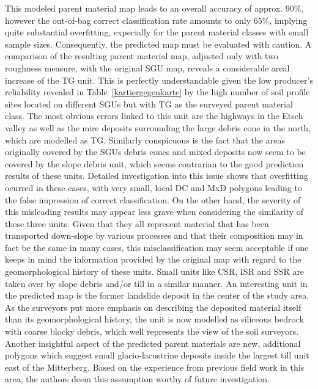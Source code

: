 \documentclass[preprint,12pt,authoryear]{elsarticle}
\begin{document}
This modeled parent material map leads to an overall accuracy of approx. 90\%, however the out-of-bag correct classification rate amounts to only 65\%, implying quite substantial overfitting, expecially for the parent material classes with small sample sizes. Consequently, the predicted map must be evaluated with caution. A comparison of the resulting parent material map, adjusted only with two roughness measure, with the original SGU map, reveals a considerable areal increase of the TG unit. This is perfectly understandable given the low producer's reliability revealed in Table~\ref{kartiergegenkarte} by the high number of soil profile sites located on different SGUs but with TG as the surveyed parent material class.  The most obvious errors linked to this unit are the highways in the Etsch valley as well as the mire deposits surrounding the large debris cone in the north, which are modelled as TG. Similarly conspicuous is the fact that the areas originally covered by the SGUs debris cones and mixed deposits now seem to be covered by the slope debris unit, which seems contrarian to the good prediction results of these units. Detailed investigation into this issue shows that overfitting ocurred in these cases, with very small, local DC and MxD polygons leading to the false impression of correct classification. On the other hand, the severity of this misleading results may appear less grave when  considering the similarity of these three units. Given that they all represent material that has been transported down-slope by various processes and that their composition may in fact be the same in many cases, this misclassification may seem acceptable if one keeps in mind the information provided by the original map with regard to the geomorphological history of these units. Small units like CSR, ISR and SSR are taken over by slope debris and/or till in a similar manner. An interesting unit in the predicted map is the former landslide deposit in the center of the study area. As the surveyors put more emphasis on describing the deposited material itself than its geomorphological history, the unit is now modelled as siliceous bedrock with coarse blocky debris, which well represents the view of the soil surveyors.  Another insightful aspect of the predicted parent materials are new, additional polygons which suggest small glacio-lacustrine deposits inside the largest till unit east of the Mitterberg. Based on the experience from previous field work in this area, the authors deem this assumption worthy of future investigation.
\end{document}
